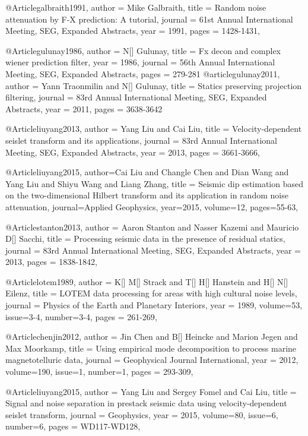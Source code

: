 @Article{galbraith1991,
  author = 	 {Mike Galbraith},
  title = 	 {Random noise attenuation by {F}-{X} prediction: A tutorial},
  journal = 	 {61st Annual International Meeting, SEG, Expanded Abstracts},
  year = 	 1991,
  pages =	 {1428-1431},
}

@Article{gulunay1986,
  author =	 {N[] Gulunay},
  title = 	 {Fx decon and complex wiener prediction filter},
  year = 	 {1986},
  journal = 	 {56th Annual International Meeting, SEG, Expanded Abstracts},  
  pages =        {279-281}
}
@article{gulunay2011,
  author =	 {Yann Traonmilin and N[] Gulunay},
  title = 	 {Statics preserving projection filtering},
  journal =    {83rd Annual International Meeting, SEG, Expanded Abstracts},
  year = 	 {2011},
  pages =        {3638-3642}
}

@Article{liuyang2013,
  author = 	 {Yang Liu and Cai Liu},
  title = 	 {Velocity-dependent seislet transform and its applications},
  journal = 	 {83rd Annual International Meeting, SEG, Expanded Abstracts},
  year = 	 2013,
  pages =	 {3661-3666},
}

@Article{liuyang2015,
  author={Cai Liu and Changle Chen and Dian Wang and Yang Liu and Shiyu Wang and Liang Zhang},
  title = {Seismic dip estimation based on the two-dimensional Hilbert transform and its application in random noise attenuation},
  journal={Applied Geophysics},
  year=2015,
  volume=12,
  pages={55-63},
}

@Article{stanton2013,
  author = 	 {Aaron Stanton and Nasser Kazemi and Mauricio D[] Sacchi},
  title = 	 {Processing seismic data in the presence of residual statics},
  journal = 	 {83rd Annual International Meeting, SEG, Expanded Abstracts},
  year = 	 2013,
  pages =	 {1838-1842},
}

@Article{lotem1989,
  author =	 { K[] M[] Strack and T[] H[] Hanstein and H[] N[] Eilenz},
  title =	 {LOTEM data processing for areas with high cultural noise levels},
  journal =	 {Physics of the Earth and Planetary Interiors},
  year =	 1989,
  volume=53,
  issue=3-4,
  number=3-4,
  pages =	 {261-269},
}

@Article{chenjin2012,
  author =	 {Jin Chen and B[] Heincke and Marion Jegen and Max Moorkamp},
  title =	 {Using empirical mode decomposition to process marine magnetotelluric data},
  journal =	 {Geophysical Journal International},
  year =	 2012,
  volume=190,
  issue=1,
  number=1,
  pages =	 {293-309},
}


@Article{liuyang2015,
  author =	 { Yang Liu and Sergey Fomel and Cai Liu},
  title =	 {Signal and noise separation in prestack seismic data using velocity-dependent seislet transform},
  journal =	 {Geophysics},
  year =	 2015,
  volume=80,
  issue=6,
  number=6,
  pages =	 {WD117-WD128},
}

